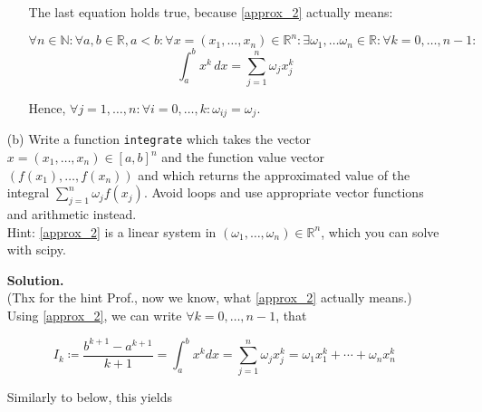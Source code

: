 \documentclass{article}
\begin{document}
\begin{itemize}
\begin{itemize}
        The last equation holds true, because \eqref{approx_2} actually means:
        
        \begin{equation*}
            \forall n \in \mathbb{N}:
            \forall a, b \in \mathbb{R}, a < b:
            \forall x = (x_1, \ldots, x_n) \in \mathbb{R}^n:
            \exists \omega_1, \ldots \omega_n \in \mathbb{R}:
            \forall k = 0, \ldots, n - 1:
        \end{equation*}
        \begin{equation*}
            \int_a^b x^k \, dx = \sum_{j = 1}^n \omega_j x_j^k
        \end{equation*}
        
        Hence, $\forall j = 1, \ldots, n:\forall i = 0, \ldots, k: \omega_{ij} = \omega_j.$
    \end{itemize}
    
    \item[(b)] Write a function \texttt{integrate} which takes the vector $x = (x_1, \ldots, x_n) \in [a, b]^n$ and the function value vector $(f(x_1), \ldots, f(x_n))$ and which returns the approximated value of the integral $\sum_{j = 1}^n \omega_j f(x_j)$. Avoid loops and use appropriate vector functions and arithmetic instead. \\
    Hint: \eqref{approx_2} is a linear system in $(\omega_1, \ldots, \omega_n) \in \mathbb{R}^n$, which you can solve with scipy.
    
    \textbf{Solution.} \\
    (Thx for the hint Prof., now we know, what \eqref{approx_2} actually means.) \\
    
    Using \eqref{approx_2}, we can write $\forall k = 0, \ldots, n - 1$, that
    
    \begin{equation*}
        I_k \coloneqq
        \frac{b^{k + 1} - a^{k + 1}}{k + 1} =
        \int_a^b x^k dx =
        \sum_{j = 1}^n \omega_j x_j^k = 
        \omega_1 x_1^k + \cdots + \omega_n x_n^k
    \end{equation*}
    
    Similarly to below, this yields
    

\end{itemize}
\end{document}
